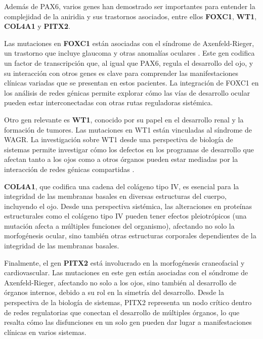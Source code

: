Además de PAX6, varios genes han demostrado ser importantes para entender la
complejidad de la aniridia y sus trastornos asociados, entre ellos \textbf{FOXC1}, \textbf{WT1},
\textbf{COL4A1} y \textbf{PITX2}.

Las mutaciones en \textbf{FOXC1} \cite{NCBIGeneFOXC1}  están asociadas con el síndrome de Axenfeld-Rieger,
un trastorno que incluye glaucoma y otras anomalías oculares \cite{Reis2023}. Este gen codifica un factor de transcripción que, al igual que PAX6, regula
el desarrollo del ojo, y su interacción con otros genes es clave para comprender las
manifestaciones clínicas variadas que se presentan en estos pacientes. La integración
de FOXC1 en los análisis de redes génicas permite explorar cómo las vías de desarrollo ocular pueden estar interconectadas con otras rutas reguladoras sistémica.


Otro gen relevante es \textbf{WT1}, conocido por su papel en el desarrollo renal y la formación de tumores. Las mutaciones en WT1 están vinculadas al síndrome de
WAGR. La investigación sobre WT1 desde una perspectiva de biología de sistemas permite investigar cómo los defectos en los programas de desarrollo que afectan
tanto a los ojos como a otros órganos pueden estar mediadas por la interacción de redes génicas compartidas \cite{Pelletier1991}.


\textbf{COL4A1}, que codifica una cadena del colágeno tipo IV, es esencial para la integridad de las membranas basales en diversas estructuras del cuerpo, incluyendo
el ojo\cite{Vahedi2011}. Desde una perspectiva sistémica, las alteraciones en proteínas estructurales como el colágeno tipo IV pueden tener efectos pleiotrópicos (una mutación afecta a múltiples funciones del organismo), afectando no solo la morfogénesis ocular, sino también otras estructuras corporales dependientes de la integridad de las membranas basales.


Finalmente, el gen \textbf{PITX2} está involucrado en la morfogénesis craneofacial y cardiovascular. Las mutaciones en este gen están asociadas con el sóndrome de Axenfeld-Rieger, afectando no solo a los ojos, sino también al desarrollo de órganos internos, debido a su rol en la simetría del desarrollo\cite{French2021}. Desde la
perspectiva de la biología de sistemas, PITX2 representa un nodo crítico dentro de redes regulatorias que conectan el desarrollo de múltiples órganos, lo que resalta cómo las disfunciones en un solo gen pueden dar lugar a manifestaciones clínicas en varios sistemas.



